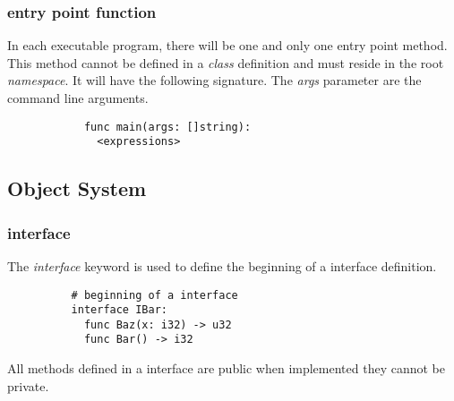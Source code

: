 \documentclass{article}
\newcommand{\subcentersec}[1]{\subsection*{\hfil #1 \hfil}}
\begin{document}
        \subsubsection*{entry point function}
          In each executable program, there will be one and only one
          entry point method. This method cannot be defined in a \textit{class}
          definition and must reside in the root \textit{namespace}. It will have
          the following signature. The \textit{args} parameter are the command
          line arguments.
          \begin{verbatim}
            func main(args: []string):
              <expressions>
          \end{verbatim}

    \subcentersec{Object System}
      \subsubsection*{interface}
        The \textit{interface} keyword is used to define the beginning of a interface
        definition.
        \begin{verbatim}
          # beginning of a interface
          interface IBar:
            func Baz(x: i32) -> u32
            func Bar() -> i32
        \end{verbatim}
        All methods defined in a interface are public when
        implemented they cannot be private.
\end{document}
